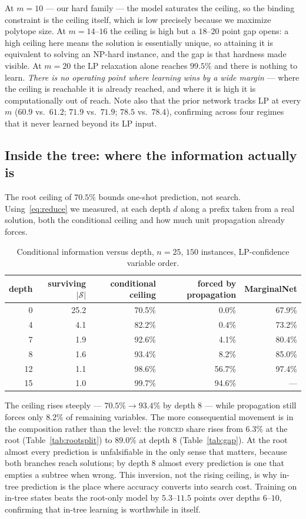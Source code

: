 \documentclass[12pt]{article}
\begin{document}
At $m=10$ --- our hard family --- the model saturates the ceiling, so the binding constraint is the ceiling itself, which is low precisely because we maximize polytope size. At $m=14$--$16$ the ceiling is high but a $18$--$20$ point gap opens: a high ceiling here means the solution is essentially unique, so attaining it is equivalent to solving an NP-hard instance, and the gap is that hardness made visible. At $m=20$ the LP relaxation alone reaches $99.5\%$ and there is nothing to learn. \emph{There is no operating point where learning wins by a wide margin} --- where the ceiling is reachable it is already reached, and where it is high it is computationally out of reach. Note also that the prior network tracks LP at every $m$ ($60.9$ vs.\ $61.2$; $71.9$ vs.\ $71.9$; $78.5$ vs.\ $78.4$), confirming across four regimes that it never learned beyond its LP input.

\subsection{Inside the tree: where the information actually is}
\label{sec:depth}

The root ceiling of $70.5\%$ bounds one-shot prediction, not search. Using~\eqref{eq:reduce} we measured, at each depth $d$ along a prefix taken from a real solution, both the conditional ceiling and how much unit propagation already forces.

\begin{table}[h]
\centering
\begin{tabular}{rrrrr}
\toprule
depth & surviving $|\mathcal{S}|$ & conditional ceiling & forced by propagation & MarginalNet \\
\midrule
0 & 25.2 & 70.5\% & 0.0\% & 67.9\% \\
4 & 4.1 & 82.2\% & 0.4\% & 73.2\% \\
7 & 1.9 & 92.6\% & 4.1\% & 80.4\% \\
8 & 1.6 & 93.4\% & 8.2\% & 85.0\% \\
12 & 1.1 & 98.6\% & 56.7\% & 97.4\% \\
15 & 1.0 & 99.7\% & 94.6\% & --- \\
\bottomrule
\end{tabular}
\caption{Conditional information versus depth, $n=25$, $150$ instances, LP-confidence variable order.}
\label{tab:depth}
\end{table}

The ceiling rises steeply --- $70.5\%\to93.4\%$ by depth $8$ --- while propagation still forces only $8.2\%$ of remaining variables. The more consequential movement is in the composition rather than the level: the \textsc{forced} share rises from $6.3\%$ at the root (Table~\ref{tab:rootsplit}) to $89.0\%$ at depth $8$ (Table~\ref{tab:gap}). At the root almost every prediction is unfalsifiable in the only sense that matters, because both branches reach solutions; by depth $8$ almost every prediction is one that empties a subtree when wrong. This inversion, not the rising ceiling, is why in-tree prediction is the place where accuracy converts into search cost. Training on in-tree states beats the root-only model by $5.3$--$11.5$ points over depths $6$--$10$, confirming that in-tree learning is worthwhile in itself.
\end{document}
